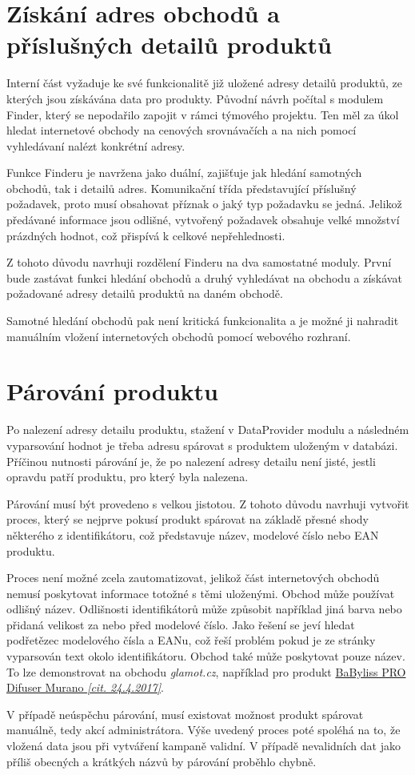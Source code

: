 \documentclass[thesis=B,czech]{FITthesis}[2012/06/26]
\begin{document}
\section{Získání adres obchodů a příslušných detailů produktů}
Interní část vyžaduje ke své funkcionalitě již uložené adresy detailů produktů, ze kterých jsou získávána data pro produkty.
Původní návrh počítal s modulem Finder, který se nepodařilo zapojit v rámci týmového projektu. Ten 
měl za úkol hledat internetové obchody na cenových srovnávačích a na nich pomocí vyhledávaní nalézt konkrétní adresy.
\par
Funkce Finderu je navržena jako duální, zajišťuje jak hledání samotných obchodů, tak i detailů adres. Komunikační třída představující příslušný požadavek, proto musí obsahovat příznak o jaký typ požadavku se jedná. Jelikož předávané informace
jsou odlišné, vytvořený požadavek obsahuje velké množství prázdných hodnot, což přispívá k celkové nepřehlednosti.
\par
Z tohoto důvodu navrhuji rozdělení Finderu na dva samostatné moduly. První bude zastávat funkci hledání obchodů a druhý
vyhledávat na obchodu a získávat požadované adresy detailů produktů na daném obchodě.
\par
Samotné hledání obchodů pak není kritická funkcionalita a je možné ji nahradit manuálním vložení internetových obchodů pomocí webového rozhraní.


\section{Párování produktu}
Po nalezení adresy detailu produktu, stažení v DataProvider modulu a následném vyparsování hodnot je třeba adresu spárovat s 
produktem uloženým v databázi. Příčinou nutnosti párování je, že po nalezení adresy detailu není jisté, jestli opravdu patří produktu, pro který 
byla nalezena. 
\par
Párování musí být provedeno s velkou jistotou. Z tohoto důvodu navrhuji vytvořit proces, který se nejprve pokusí produkt spárovat na základě
přesné shody některého z identifikátoru, což představuje název, modelové číslo nebo EAN produktu. 
\par
Proces není možné zcela zautomatizovat, jelikož část internetových obchodů nemusí poskytovat informace totožné s těmi uloženými.
Obchod může používat odlišný název. Odlišnosti identifikátorů může způsobit například jiná barva nebo přidaná velikost za nebo před modelové
číslo. Jako řešení se jeví hledat podřetězec modelového čísla a EANu, což řeší problém pokud je ze stránky vyparsován text okolo
identifikátoru. Obchod také může poskytovat pouze název. To lze demonstrovat na obchodu \textit{glamot.cz}, například
pro produkt 
\href{https://www.glamot.cz/p/19128/difuzer-k-vysouseci-babyliss-pro-difuser-murano}{BaByliss PRO Difuser Murano \textit{[cit. 24.4.2017]}}.
\par
V případě neúspěchu párování, musí existovat možnost produkt spárovat manuálně, tedy akcí administrátora. 
Výše uvedený proces poté spoléhá na to, že vložená data jsou při vytváření kampaně validní. V případě nevalidních dat jako
příliš obecných a krátkých názvů by párování proběhlo chybně.
\end{document}
